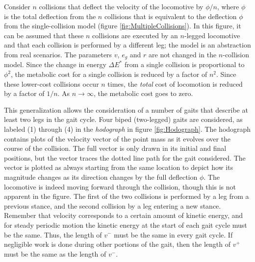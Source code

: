 Consider $n$ collisions that deflect the velocity of the locomotive by $\phi/n$, where $\phi$ is the total deflection from the $n$ collisions that is equivalent to the deflection $\phi$ from the single-collision model (figure \ref{fig:MultipleCollisions}). In this figure, it can be assumed that these $n$ collisions are executed by an $n$-legged locomotive and that each collision is performed by a different leg; the model is an abstraction from real scenarios. The parameters $v$, $e_{g}$ and $r$ are not changed in the $n$-collision model. Since the change in energy $\Delta E^*$ from a single collision is proportional to $\phi^2$, the metabolic cost for a single collision is reduced by a factor of $n^2$. Since these lower-cost collisions occur $n$ times, the \emph{total} cost of locomotion is reduced by a factor of $1/n$. As $n \rightarrow \infty$, the metabolic cost goes to zero.

This generalization allows the consideration of a number of gaits that describe at least two legs in the gait cycle.  Four biped (two-legged) gaits are considered, as labeled (1) through (4) in the \textit{hodograph} in figure \ref{fig:Hodograph}. The hodograph contains plots of the velocity vector of the point mass as it evolves over the course of the collision. The full vector is only drawn in its initial and final positions, but the vector traces the dotted line path for the gait considered. The vector is plotted as always starting from the same location to depict how its magnitude changes as its direction changes by the full deflection $\phi$. The locomotive is indeed moving forward through the collision, though this is not apparent in the figure. The first of the two collisions is performed by a leg from a previous stance, and the second collision by a leg entering a new stance. Remember that velocity corresponds to a certain amount of kinetic energy, and for steady periodic motion the kinetic energy at the start of each gait cycle must be the same. Thus, the length of $v^{-}$ must be the same in every gait cycle. If negligible work is done during other portions of the gait, then the length of $v^{+}$ must be the same as the length of $v^{-}$. 

